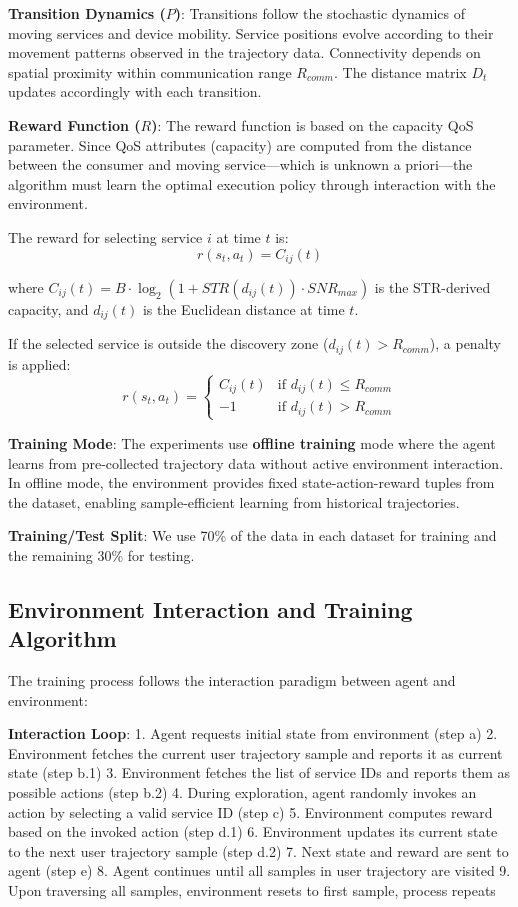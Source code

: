 \documentclass[10pt,twocolumn]{article}
\begin{document}
\textbf{Transition Dynamics (\(P\))}: Transitions follow the stochastic
dynamics of moving services and device mobility. Service positions
evolve according to their movement patterns observed in the trajectory
data. Connectivity depends on spatial proximity within communication
range \(R_{comm}\). The distance matrix \(D_t\) updates accordingly
with each transition.

\textbf{Reward Function (\(R\))}: The reward function is based on the
capacity QoS parameter. Since QoS attributes (capacity) are computed
from the distance between the consumer and moving service---which is
unknown a priori---the algorithm must learn the optimal execution
policy through interaction with the environment.

The reward for selecting service \(i\) at time \(t\) is:
\[r(s_t, a_t) = C_{ij}(t)\]

where \(C_{ij}(t) = B \cdot \log_2(1 + STR(d_{ij}(t)) \cdot SNR_{max})\)
is the STR-derived capacity, and \(d_{ij}(t)\) is the Euclidean distance
at time \(t\).

If the selected service is outside the discovery zone
(\(d_{ij}(t) > R_{comm}\)), a penalty is applied:
\[r(s_t, a_t) = \begin{cases} C_{ij}(t) & \text{if } d_{ij}(t) \leq R_{comm} \\ -1 & \text{if } d_{ij}(t) > R_{comm} \end{cases}\]

\textbf{Training Mode}: The experiments use \textbf{offline training}
mode where the agent learns from pre-collected trajectory data without
active environment interaction. In offline mode, the environment
provides fixed state-action-reward tuples from the dataset, enabling
sample-efficient learning from historical trajectories.

\textbf{Training/Test Split}: We use 70\% of the data in each dataset
for training and the remaining 30\% for testing.

\subsection{Environment Interaction and Training Algorithm}\label{environment-interaction-and-training-algorithm}

The training process follows the interaction paradigm between agent and
environment:

\textbf{Interaction Loop}: 1. Agent requests initial state from
environment (step a) 2. Environment fetches the current user trajectory
sample and reports it as current state (step b.1) 3. Environment fetches
the list of service IDs and reports them as possible actions (step b.2)
4. During exploration, agent randomly invokes an action by selecting a
valid service ID (step c) 5. Environment computes reward based on the
invoked action (step d.1) 6. Environment updates its current state to
the next user trajectory sample (step d.2) 7. Next state and reward are
sent to agent (step e) 8. Agent continues until all samples in user
trajectory are visited 9. Upon traversing all samples, environment
resets to first sample, process repeats
\end{document}
